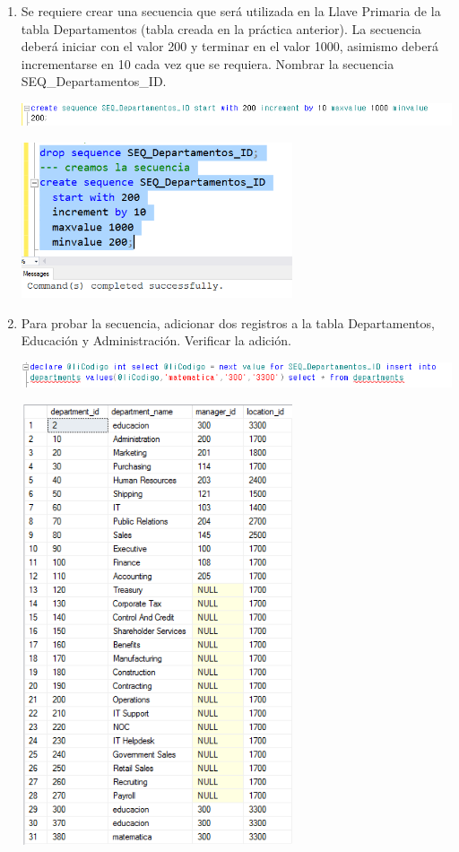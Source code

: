 \begin{enumerate}[1.]
	\item Se requiere crear una secuencia que será utilizada en la Llave Primaria de la tabla Departamentos (tabla creada en la práctica anterior). La secuencia deberá iniciar con el valor 200 y terminar en el valor 1000, asimismo deberá incrementarse en 10 cada vez que se requiera. Nombrar la secuencia SEQ\_Departamentos\_ID.
	
	\begin{center}
	\includegraphics[width=18cm]{./Imagenes/activ3_5} 
	\end{center}	
		
	\begin{center}
	\includegraphics[width=8cm]{./Imagenes/actividad_03_05} 
	\end{center}

	\item Para probar la secuencia, adicionar dos registros a la tabla Departamentos, Educación y Administración. Verificar la adición.
	
	\begin{center}
	\includegraphics[width=18cm]{./Imagenes/activ3_6} 
	\end{center}
	\begin{center}
	\includegraphics[width=8cm]{./Imagenes/actividad_03_06} 
	\end{center}


\end{enumerate}
